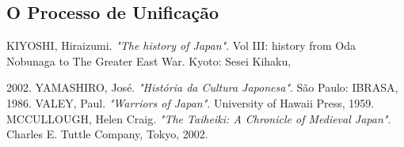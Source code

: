 \documentclass[12pt, a4paper]{article}
\begin{document}
        \subsection {O Processo de Unificação}
            
    \newpage
    \begin{thebibliography}{9}
            \uppercase{kiyoshi}, Hiraizumi.
            \emph{"The history of Japan"}.
            Vol III: history from Oda Nobunaga to The Greater East War.
            Kyoto: Sesei Kihaku,

            2002.
            \uppercase{yamashiro}, José.
            \emph{"História da Cultura Japonesa"}.
            São Paulo: IBRASA,
            1986.
            \uppercase{valey}, Paul.
            \emph{"Warriors of Japan"}.
            University of Hawaii Press,
            1959.
            \uppercase{mccullough}, Helen Craig.
            \emph{"The Taiheiki: A Chronicle of Medieval Japan"}.
            Charles E. Tuttle Company, Tokyo,
            2002.
    \end{thebibliography}
\end{document}
